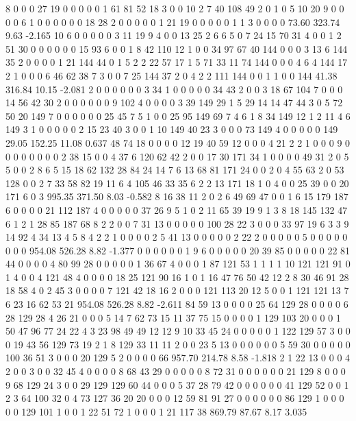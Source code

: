  8 0 0 0 27 19 0 0 0 0 0 1 61 81 52 18 3 0 0 10
 2 7 40 108 49 2 0 1 0 5 10 20 9 0 0 0 0 6 1 0
 0 0 0 0 0 18 28 2 0 0 0 0 0 1 21 19 0 0 0 0
 0 1 1 3 0 0 0 0
73.60 323.74 9.63 -2.165
 10 6 0 0 0 0 0 3 11 19 9 4 0 0 13 25 2 6 6 5
 0 7 24 15 70 31 4 0 0 1 2 51 30 0 0 0 0 0 0 15
 93 6 0 0 1 8 42 110 12 1 0 0 34 97 67 40 144 0 0 0
 3 13 6 144 35 2 0 0 0 0 1 21 144 44 0 1 5 2 2 22
 57 17 1 5 71 33 11 74 144 0 0 0 4 6 4 144 17 2 1 0
 0 0 6 46 62 38 7 3 0 0 7 25 144 37 2 0 4 2 2 111
 144 0 0 1 1 0 0 144
41.38 316.84 10.15 -2.081
 2 0 0 0 0 0 0 3 34 1 0 0 0 0 0 34 43 2 0 0
 3 18 67 104 7 0 0 0 14 56 42 30 2 0 0 0 0 0 0 9
 102 4 0 0 0 0 3 39 149 29 1 5 29 14 14 47 44 3 0 5
 72 50 20 149 7 0 0 0 0 0 0 25 45 7 5 1 0 0 25 95
 149 69 7 4 6 1 8 34 149 12 1 2 11 4 6 149 3 1 0 0
 0 0 0 2 15 23 40 3 0 0 1 10 149 40 23 3 0 0 0 73
 149 4 0 0 0 0 0 149
29.05 152.25 11.08 0.637
 48 74 18 0 0 0 0 12 19 40 59 12 0 0 0 4 21 2 2 1
 0 0 0 9 0 0 0 0 0 0 0 0 2 38 15 0 0 4 37 6
 120 62 42 2 0 0 17 30 171 34 1 0 0 0 0 49 31 2 0 5
 5 0 0 2 8 6 5 15 18 62 132 28 84 24 14 7 6 13 68 81
 171 24 0 0 2 0 4 55 63 2 0 53 128 0 0 2 7 33 58 82
 19 11 6 4 105 46 33 35 6 2 2 13 171 18 1 0 4 0 0 25
 39 0 0 20 171 6 0 3
995.35 371.50 8.03 -0.582
 8 16 38 11 2 0 2 6 49 69 47 0 0 1 6 15 179 187 6 0
 0 0 0 21 112 187 4 0 0 0 0 0 37 26 9 5 1 0 2 11
 65 39 19 9 1 3 8 18 145 132 47 6 1 2 1 28 85 187 68 8
 2 2 0 0 7 31 13 0 0 0 0 0 100 28 22 3 0 0 0 33
 97 19 6 3 3 9 14 92 4 34 13 4 5 8 4 2 2 1 0 0
 0 0 2 5 41 13 0 0 0 0 0 2 22 2 0 0 0 0 0 5
 0 0 0 0 0 0 0 0
954.08 526.28 8.82 -1.377
 0 0 0 0 0 0 1 9 6 0 0 0 0 0 20 39 85 0 0 0
 0 0 22 81 44 0 0 0 0 4 80 99 28 0 0 0 0 0 1 36
 67 4 0 0 0 1 87 121 53 1 1 1 1 10 121 121 91 0 1 4
 0 0 4 121 48 4 0 0 0 0 18 25 121 90 16 1 0 1 16 47
 76 50 42 12 2 8 30 46 91 28 18 58 4 0 2 45 3 0 0 0
 0 7 121 42 18 16 2 0 0 0 121 113 20 12 5 0 0 1 121 121
 13 7 6 23 16 62 53 21
954.08 526.28 8.82 -2.611
 84 59 13 0 0 0 0 25 64 129 28 0 0 0 0 6 28 129 28 4
 26 21 0 0 0 5 14 7 62 73 15 11 37 75 15 0 0 0 0 1
 129 103 20 0 0 0 1 50 47 96 77 24 22 4 3 23 98 49 49 12
 12 9 10 33 45 24 0 0 0 0 0 1 122 129 57 3 0 0 0 19
 43 56 129 73 19 2 1 8 129 33 11 11 2 0 0 23 5 13 0 0
 0 0 0 0 5 59 30 0 0 0 0 0 100 36 51 3 0 0 0 20
 129 5 2 0 0 0 0 66
957.70 214.78 8.58 -1.818
 2 1 22 13 0 0 0 4 2 0 0 3 0 0 32 45 4 0 0 0
 0 8 68 43 29 0 0 0 0 0 8 72 31 0 0 0 0 0 0 21
 129 8 0 0 0 9 68 129 24 3 0 0 29 129 129 60 44 0 0 0
 5 37 28 79 42 0 0 0 0 0 0 41 129 52 0 0 1 2 3 64
 100 32 0 4 73 127 36 20 20 0 0 0 12 59 81 91 27 0 0 0
 0 0 0 86 129 1 0 0 0 0 0 129 101 1 0 0 1 22 51 72
 1 0 0 0 1 21 117 38
869.79 87.67 8.17 3.035
